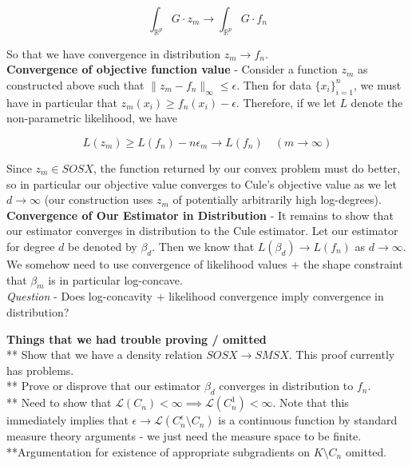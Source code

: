 \documentclass[11pt,reqno]{amsart}
\theoremstyle{definition}
\numberwithin{equation}{section}
\newcommand{\be}{\beta}
\newcommand{\eps}{\epsilon}
\newcommand{\mc}{\mathcal}
\newcommand{\mr}{\mathbb{R}}
\newcommand{\tb}{\textbf}
\begin{document}
\[
\int_{\mr^p} G\cdot z_m \to \int_{\mr^p} G \cdot f_n
\]

So that we have convergence in distribution $z_m \to f_n$. \\

\tb{Convergence of objective function value} - Consider a function $z_m$ as constructed above such that $\|z_m - f_n\|_{\infty} \leq \eps$. Then for data $\{x_i\}_{i = 1}^n$, we must have in particular that $z_m(x_i) \geq f_n(x_i) - \eps$. Therefore, if we let $L$ denote the non-parametric likelihood, we have 

\[
L(z_m) \geq L(f_n) - n \eps_m \to L(f_n) \quad (m \to \infty) 
\]

Since $z_m \in SOSX$, the function returned by our convex problem must do better, so in particular our objective value converges to Cule's objective value as we let $d \to \infty$ (our construction uses $z_m$ of potentially arbitrarily high log-degrees). \\

\tb{Convergence of Our Estimator in Distribution} - It remains to show that our estimator converges in distribution to the Cule estimator. Let our estimator for degree $d$ be denoted by $\be_d$. Then we know that $L(\be_d) \to L(f_n)$ as $d \to \infty$. We somehow need to use convergence of likelihood values + the shape constraint that $\beta_m$ is in particular log-concave. \\

\emph{Question} - Does log-concavity + likelihood convergence imply convergence in distribution? 

















\clearpage


\tb{Things that we had trouble proving / omitted } \\

** Show that we have a density relation $SOSX \longrightarrow SMSX$. This proof currently has problems. \\

** Prove or disprove that our estimator $\be_d$ converges in distribution to $f_n$. \\

** Need to show that $\mc{L}(C_n) < \infty \implies \mc{L}(C_n^1) < \infty $. Note that this immediately implies that $\eps \to \mc{L}(C_n^{\eps} \setminus C_n)$ is a continuous function by standard measure theory arguments - we just need the measure space to be finite. \\

**Argumentation for existence of appropriate subgradients on $K \setminus C_n$ omitted. 
\end{document}
